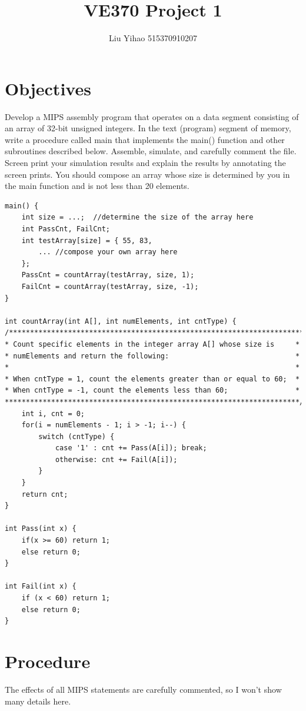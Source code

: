 \documentclass{article}
\title{VE370 Project 1}
\author{Liu Yihao 515370910207}
\date{}
\begin{document}
\maketitle

\section{Objectives}
Develop a MIPS assembly program that operates on a data segment consisting of an array of 32-bit unsigned integers. In the text (program) segment of memory, write a procedure called main that implements the main() function and other subroutines described below. Assemble, simulate, and carefully comment the file. Screen print your simulation results and explain the results by annotating the screen prints. You should compose an array whose size is determined by you in the main function and is not less than 20 elements. 

\begin{verbatim}
main() {
    int size = ...;  //determine the size of the array here
    int PassCnt, FailCnt;							
    int testArray[size] = { 55, 83,   
        ... //compose your own array here
    };				
    PassCnt = countArray(testArray, size, 1);						
    FailCnt = countArray(testArray, size, -1);						
}		
								
int countArray(int A[], int numElements, int cntType) {					
/**********************************************************************
* Count specific elements in the integer array A[] whose size is     *
* numElements and return the following:                              *
*                                                                    *
* When cntType = 1, count the elements greater than or equal to 60;  *
* When cntType = -1, count the elements less than 60;                *
**********************************************************************/
    int i, cnt = 0;									
    for(i = numElements - 1; i > -1; i--) {						
	    switch (cntType) {								
            case '1' : cnt += Pass(A[i]); break;			
            otherwise: cnt += Fail(A[i]); 			
	    }								
    }							
    return cnt;							
}							
							
int Pass(int x) {							
    if(x >= 60) return 1;						
    else return 0;						
}							
							
int Fail(int x) {							
    if (x < 60) return 1;						
    else return 0;						
}
\end{verbatim}

\section{Procedure}
The effects of all MIPS statements are carefully commented, so I won't show many details here.
\end{document}
